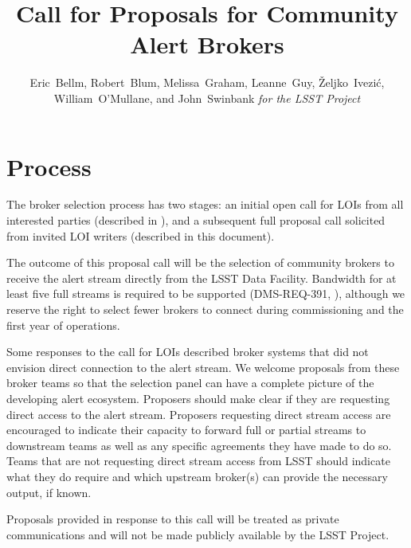 \documentclass[DM,toc,lsstdraft]{lsstdoc}
\title{Call for Proposals for Community Alert Brokers}
\author{
Eric~Bellm,
Robert~Blum,
Melissa~Graham,
Leanne~Guy,
\v{Z}eljko~Ivezi\'{c},
William~O'Mullane,
and John~Swinbank
\emph{for the LSST Project}
}
\begin{document}

\maketitle

\section{Process}

The broker selection process has two stages:
an initial open call for LOIs from all interested parties (described in ), and a subsequent full proposal call solicited from invited LOI writers (described in this document).

The outcome of this proposal call will be the selection of community brokers to receive the alert stream directly from the LSST Data Facility.
Bandwidth for at least five full streams is required to be supported (DMS-REQ-391, ), although we reserve the right to select fewer brokers to connect during commissioning and the first year of operations.

Some responses to the call for LOIs described broker systems that did not envision direct connection to the alert stream.
We welcome proposals from these broker teams so that the selection panel can have a complete picture of the developing alert ecosystem.
Proposers should make clear if they are requesting direct access to the alert stream.
Proposers requesting direct stream access are encouraged to indicate their capacity to forward full or partial streams to downstream teams as well as any specific agreements they have made to do so. 
Teams that are not requesting direct stream access from LSST should indicate what they do require and which upstream broker(s) can provide the necessary output, if known.

Proposals provided in response to this call will be treated as private communications and will not be made publicly available by the LSST Project.
\end{document}
